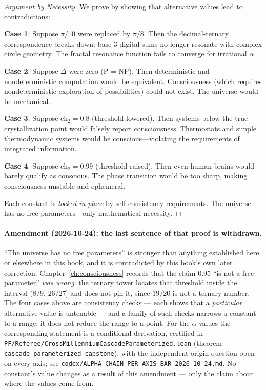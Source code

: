 \begin{proof}[Argument by Necessity]
We prove by showing that alternative values lead to contradictions:

\textbf{Case 1}: Suppose $\pi/10$ were replaced by $\pi/8$. Then the decimal-ternary correspondence breaks down: base-3 digital sums no longer resonate with complex circle geometry. The fractal resonance function fails to converge for irrational $\alpha$.

\textbf{Case 2}: Suppose $\Delta$ were zero (P = NP). Then deterministic and nondeterministic computation would be equivalent. Consciousness (which requires nondeterministic exploration of possibilities) could not exist. The universe would be mechanical.

\textbf{Case 3}: Suppose $\text{ch}_2 = 0.8$ (threshold lowered). Then systems below the true crystallization point would falsely report consciousness. Thermostats and simple thermodynamic systems would be conscious---violating the requirements of integrated information.

\textbf{Case 4}: Suppose $\text{ch}_2 = 0.99$ (threshold raised). Then even human brains would barely qualify as conscious. The phase transition would be too sharp, making consciousness unstable and ephemeral.

Each constant is \textit{locked in place} by self-consistency requirements. The universe has no free parameters---only mathematical necessity.
\end{proof}

\paragraph{Amendment (2026-10-24): the last sentence of that proof is
withdrawn.}
``The universe has no free parameters'' is stronger than anything
established here or elsewhere in this book, and it is contradicted by
this book's own later correction. Chapter~\ref{ch:consciousness}
records that the claim $0.95$ ``is not a free parameter'' \emph{was
wrong}: the ternary tower locates that threshold inside the interval
$(8/9,\,26/27]$ and does not pin it, since $19/20$ is not a ternary
number. The four cases above are consistency checks --- each shows that
a \emph{particular} alternative value is untenable --- and a family of
such checks narrows a constant to a range; it does not reduce the range
to a point. For the $\alpha$-values the corresponding statement is a
conditional derivation, certified in
\texttt{PF/Referee/Cross\-Millennium\-Cascade\-Parameterized.lean}
(theorem \texttt{cascade\_parameterized\_capstone}), with the
independent-origin question open on every axis; see
\texttt{codex/ALPHA\_CHAIN\_PER\_AXIS\_BAR\_2026-10-24.md}. No
constant's value changes as a result of this amendment --- only the
claim about where the values come from.

